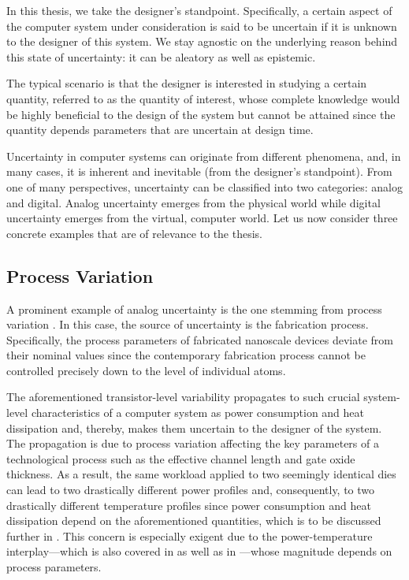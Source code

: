 In this thesis, we take the designer's standpoint. Specifically, a certain
aspect of the computer system under consideration is said to be uncertain if it
is unknown to the designer of this system. We stay agnostic on the underlying
reason behind this state of uncertainty: it can be aleatory as well as
epistemic.

The typical scenario is that the designer is interested in studying a certain
quantity, referred to as the quantity of interest, whose complete knowledge
would be highly beneficial to the design of the system but cannot be attained
since the quantity depends parameters that are uncertain at design time.

Uncertainty in computer systems can originate from different phenomena, and, in
many cases, it is inherent and inevitable (from the designer's standpoint). From
one of many perspectives, uncertainty can be classified into two categories:
analog and digital. Analog uncertainty emerges from the physical world while
digital uncertainty emerges from the virtual, computer world. Let us now
consider three concrete examples that are of relevance to the thesis.

\subsection{Process Variation}

A prominent example of analog uncertainty is the one stemming from process
variation \cite{chandrakasan2000, srivastava2010}. In this case, the source of
uncertainty is the fabrication process. Specifically, the process parameters of
fabricated nanoscale devices deviate from their nominal values since the
contemporary fabrication process cannot be controlled precisely down to the
level of individual atoms.

The aforementioned transistor-level variability propagates to such crucial
system-level characteristics of a computer system as power consumption and heat
dissipation and, thereby, makes them uncertain to the designer of the system.
The propagation is due to process variation affecting the key parameters of a
technological process such as the effective channel length and gate oxide
thickness. As a result, the same workload applied to two seemingly identical
dies can lead to two drastically different power profiles and, consequently, to
two drastically different temperature profiles since power consumption and heat
dissipation depend on the aforementioned quantities, which is to be discussed
further in . This concern is especially exigent due to the
power-temperature interplay---which is also covered in  as
well as in ---whose magnitude depends on
process parameters.

